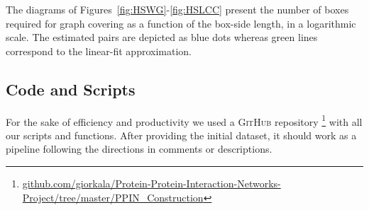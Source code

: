 The diagrams of Figures~\ref{fig:HSWG}-\ref{fig:HSLCC} present the number of boxes required for graph covering as a function of the box-side length, in a logarithmic scale. The estimated pairs are depicted as blue dots whereas green lines correspond to the linear-fit approximation.    

\subsection*{Code and Scripts} For the sake of efficiency and productivity we used a \textsc{GitHub} repository \footnote{ \url{github.com/giorkala/Protein-Protein-Interaction-Networks-Project/tree/master/PPIN_Construction}} with all our scripts and functions. After providing the initial dataset, it should work as a pipeline following the directions in comments or descriptions.


